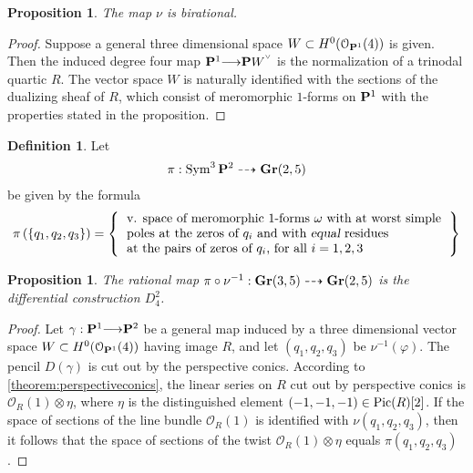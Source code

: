 \documentclass[11pt,reqno]{amsart}
\theoremstyle{plain}
\newtheorem{proposition}[theorem]{Proposition}
\theoremstyle{definition}
\newtheorem{definition}[theorem]{Definition}
\theoremstyle{remark}
\numberwithin{equation}{section}
\newcommand{\todo}[1]{\fbox{ToDo: #1}}
\renewcommand{\to}{{\longrightarrow}}
\numberwithin{equation}{section}
\renewcommand{\O}{\mathcal O}
\newcommand{\smvee}{\raise0.5ex\hbox{$\scriptscriptstyle\vee$}}
\begin{document}
\begin{proposition}
  \label{proposition:symtwoptwo}
The map $\nu$ is birational.
\end{proposition}
\begin{proof}
  Suppose a general three dimensional space $W \subset H^{0}(\O_{\P^{1}}(4))$ is given. Then the induced degree four map $\P^{1} \to \P W^{\smvee}$ is the normalization of a trinodal quartic $R$. The vector space $W$ is naturally identified with the sections of the dualizing sheaf of $R$, which consist of meromorphic $1$-forms on $\P^{1}$ with the properties stated in the proposition.
\end{proof}

\begin{definition}
  \label{definition:pi}
  Let
  \begin{align*}
    \pi: \Sym^{3}\P^{2} \dashrightarrow \Gr(2,5)
  \end{align*}
  be given by the formula
  \begin{align*}
\pi\left (\{q_{1},q_{2},q_{3}\}\right ) =    \left\{ \begin{tabular}{l}
      v. space of meromorphic $1$-forms $\omega$ with at worst simple\\
      poles at the zeros of $q_{i}$ and with {\sl equal} residues\\
      at the pairs of zeros of $q_{i}$, for all $i = 1,2,3$
    \end{tabular}\right\}
  \end{align*}
 
\end{definition}

\begin{proposition}
  \label{proposition:reinterpretTangent}
  The rational map $\pi \circ \nu^{-1} : \Gr(3,5) \dashrightarrow \Gr(2,5)$ is the differential construction $D^{2}_{4}$.
\end{proposition}
\begin{proof}
  Let $\gamma : \P^{1} \to \P^{2}$ be a general map induced by a three dimensional vector space $W \subset H^{0}(\O_{\P^{1}}(4))$ having image $R$, and let $(q_{1},q_{2},q_{3})$ be $\nu^{-1}(\varphi)$. The pencil $D(\gamma)$ is cut out by the perspective conics. \todo{Why?} According to \autoref{theorem:perspectiveconics}, the linear series on $R$ cut out by perspective conics is $\O_{R}(1) \otimes \eta$, where $\eta$ is the distinguished element $(-1,-1,-1) \in \Pic(R)[2]$.
  If the space of sections of the line bundle $\O_{R}(1)$ is identified with $\nu(q_{1},q_{2},q_{3})$, then it follows that the space of sections of the twist $\O_{R}(1)\otimes \eta$ equals $\pi(q_{1},q_{2},q_{3})$. 
\end{proof}
\end{document}
